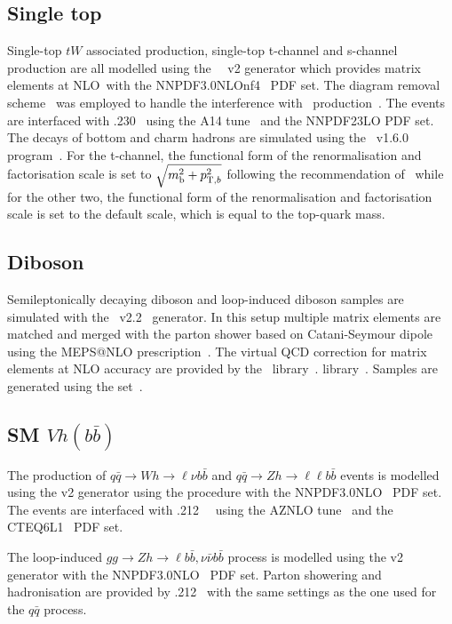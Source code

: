 \subsection{Single top}
\par  Single-top $tW$ associated production, single-top t-channel and s-channel production are all modelled using the \powhegbox~\cite{Frederix:2012dh,Nason:2004rx,Frixione:2007vw,Alioli:2010xd}~v2
generator which provides matrix elements at NLO\
with the NNPDF3.0NLOnf4~\cite{Ball:2014uwa} PDF set.
The diagram removal scheme~\cite{Frixione:2008yi} was employed to handle the interference with \ttbar\ production~\cite{ATL-PHYS-PUB-2016-020}.
The events are interfaced with \pythia.230~\cite{Sjostrand:2014zea} using the A14 tune~\cite{ATL-PHYS-PUB-2014-021} and the NNPDF23LO PDF set.
The decays of bottom and charm hadrons are simulated using the \evtgen\ v1.6.0 program~\cite{EvtGen}.
For the t-channel, the functional form of the renormalisation and factorisation scale is set to $\sqrt{m_{\textrm{b}}^2 + p_{{\textrm T},b}^2}$
following the recommendation of~\cite{Frederix:2012dh} while for the other two, the functional form of the renormalisation and factorisation scale is set to the default scale, which is equal to the top-quark mass.
\subsection{Diboson}
\par Semileptonically decaying diboson and loop-induced diboson samples are simulated with the
\sherpa~v2.2~\cite{Bothmann:2019yzt} generator. In this setup multiple
matrix elements are matched and merged with the \sherpa parton shower
based on Catani-Seymour dipole~\cite{Gleisberg:2008fv,Schumann:2007mg}
using the MEPS@NLO
prescription~\cite{Hoeche:2011fd,Hoeche:2012yf,Catani:2001cc,Hoeche:2009rj}. 
The virtual QCD correction for matrix elements at NLO accuracy are
provided by the \openloops\ library~\cite{Cascioli:2011va,Denner:2016kdg}. 
library~\cite{Denner:2016kdg}. Samples are generated using the
\nnpdfnnlo set~\cite{Ball:2014uwa}.
\subsection{SM $Vh(b\bar{b})$}

\par The production of $q\bar{q}\to Wh\to \ell\nu b\bar{b}$ and $q\bar{q}\to Zh\to \ell\ell b\bar{b}$ events is modelled using the \powhegbox v2 generator
\cite{Alioli:2010xd} using the \minlo procedure \cite{Hamilton:2012np,Luisoni:2013kna} with the NNPDF3.0NLO~\cite{Ball:2014uwa} PDF set.
The events are interfaced with \pythia.212~\cite{Sjostrand:2014zea}~ using the AZNLO tune~\cite{Aad:2014xaa} and the CTEQ6L1~\cite{Pumplin:2002vw} PDF set.
\par The loop-induced $gg\to Zh \to \ell b\bar{b}, \nu\bar{\nu}b\bar{b}$ process is modelled using the \powhegbox v2 generator \cite{Alioli:2010xd} with the NNPDF3.0NLO~\cite{Ball:2014uwa} PDF set.
Parton showering and hadronisation are provided by \pythia.212~\cite{Sjostrand:2014zea} with the same settings as the one used for the $q\bar{q}$ process.


